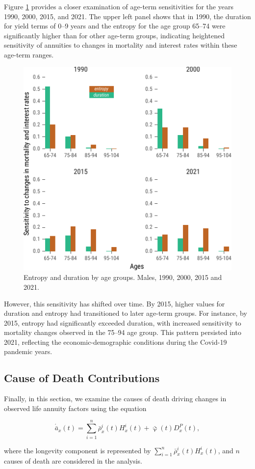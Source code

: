\documentclass[12pt]{article}
\begin{document}
Figure \ref{fig:Fig6} provides a closer examination of age-term sensitivities for the years 1990, 2000, 2015, and 2021. The upper left panel shows that in 1990, the duration for yield terms of 0–9 years and the entropy for the age group 65–74 were significantly higher than for other age-term groups, indicating heightened sensitivity of annuities to changes in mortality and interest rates within these age-term ranges. 

\begin{figure}[H]
	\centering
	\includegraphics[width=0.6\linewidth]{Fig/attributionEntropyDuration}
	\caption{{Entropy and duration by age groups. Males, 1990, 2000, 2015 and 2021.}}
	\label{fig:Fig6}
\end{figure}


However, this sensitivity has shifted over time. By 2015, higher values for duration and entropy had transitioned to later age-term groups. For instance, by 2015, entropy had significantly exceeded duration, with increased sensitivity to mortality changes observed in the 75–94 age group. This pattern persisted into 2021, reflecting the economic-demographic conditions during the Covid-19 pandemic years.

\subsection{Cause of Death Contributions}

Finally, in this section, we examine the causes of death driving changes in observed life annuity factors using the equation 

\[
\acute{\bar{a}}_x(t) = \sum_{i=1}^{n} \bar{\rho}^i_x(t) {H}^i_x(t) + \bar{\upvarphi}(t) {D}^P_x(t),
\]

where the longevity component is represented by \( \sum_{i=1}^{n} \bar{\rho}^i_x(t) {H}^i_x(t) \), and \( n \) causes of death are considered in the analysis.
\end{document}
